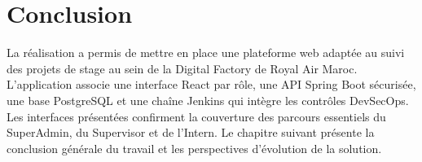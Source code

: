 
\section*{Conclusion}
La réalisation a permis de mettre en place une plateforme web adaptée au suivi des projets de stage au sein de la Digital Factory de Royal Air Maroc. L'application associe une interface React par rôle, une API Spring Boot sécurisée, une base PostgreSQL et une chaîne Jenkins qui intègre les contrôles DevSecOps. Les interfaces présentées confirment la couverture des parcours essentiels du SuperAdmin, du Supervisor et de l'Intern. Le chapitre suivant présente la conclusion générale du travail et les perspectives d'évolution de la solution.

